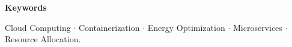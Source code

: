 \lipsum[1]


\textbf{Keywords} 
    
Cloud Computing $\cdot$ Containerization $\cdot$ Energy Optimization $\cdot$ Microservices $\cdot$ Resource Allocation.
